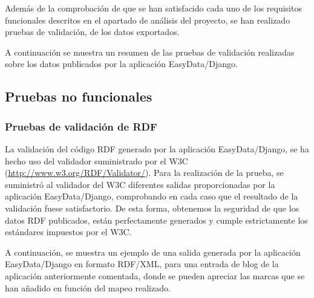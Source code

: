 Además de la comprobación de que se han satisfacido cada uno de los requisitos
funcionales descritos en el apartado de análisis del proyecto, se han realizado
pruebas de validación, de los datos exportados.

A continuación se muestra un resumen de las pruebas de validación realizadas
sobre los datos publicados por la aplicación EasyData/Django.

\subsection{Pruebas no funcionales} 

\subsubsection{Pruebas de validación de RDF}

La validación del código RDF generado por la aplicación EasyData/Django, se ha
hecho uso del validador suministrado por el W3C
(\url{http://www.w3.org/RDF/Validator/}). Para la realización de la prueba, se
suministró al validador del W3C diferentes salidas proporcionadas por la
aplicación EasyData/Django, comprobando en cada caso que el resultado de la
validación fuese satisfactorio. De esta forma, obtenemos la seguridad de que los
datos RDF publicados, están perfectamente generados y cumple estrictamente los
estándares impuestos por el W3C.

A continuación, se muestra un ejemplo de una salida generada por la aplicación
EasyData/Django en formato RDF/XML, para una entrada de blog de la aplicación
anteriormente comentada, donde se pueden apreciar las marcas que se han añadido
en función del mapeo realizado.

